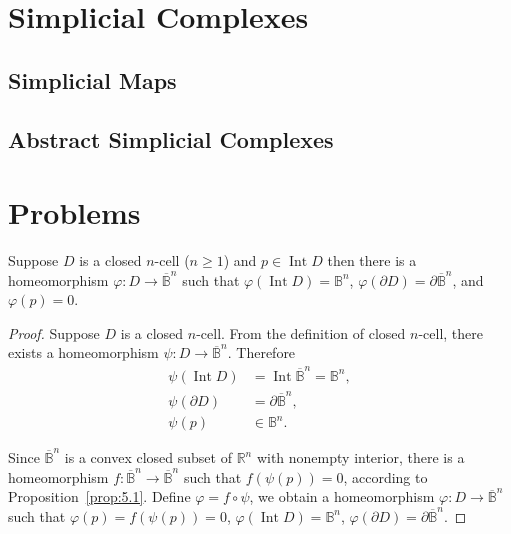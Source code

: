 \section{Simplicial Complexes}

\subsection{Simplicial Maps}

\subsection{Abstract Simplicial Complexes}

\section*{Problems}

\begin{note}\label{note:closed-cell-homeomorphism}
	Suppose $D$ is a closed $n$-cell ($n\geq 1$) and $p\in \operatorname{Int} D$ then there is a homeomorphism $\varphi: D \to \overline{\mathbb{B}}^{n}$ such that $\varphi(\operatorname{Int} D) = \mathbb{B}^{n}$, $\varphi(\partial D) = \partial \overline{\mathbb{B}}^{n}$, and $\varphi(p) = 0$.
\end{note}

\begin{proof}
	Suppose $D$ is a closed $n$-cell. From the definition of closed $n$-cell, there exists a homeomorphism $\psi: D \to \overline{\mathbb{B}}^{n}$. Therefore
	\begin{align*}
		\psi(\operatorname{Int} D) & = \operatorname{Int} \overline{\mathbb{B}}^{n} = \mathbb{B}^{n}, \\
		\psi(\partial D)           & = \partial \overline{\mathbb{B}}^{n},                            \\
		\psi(p)                    & \in \mathbb{B}^{n}.
	\end{align*}

	Since $\overline{\mathbb{B}}^{n}$ is a convex closed subset of $\mathbb{R}^{n}$ with nonempty interior, there is a homeomorphism $f: \overline{\mathbb{B}}^{n} \to \overline{\mathbb{B}}^{n}$ such that $f(\psi(p)) = 0$, according to Proposition~\ref{prop:5.1}. Define $\varphi = f\circ \psi$, we obtain a homeomorphism $\varphi: D \to \overline{\mathbb{B}}^{n}$ such that $\varphi(p) = f(\psi(p)) = 0$, $\varphi(\operatorname{Int} D) = \mathbb{B}^{n}$, $\varphi(\partial D) = \partial \overline{\mathbb{B}}^{n}$.
\end{proof}

